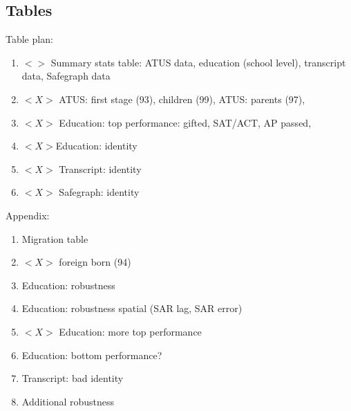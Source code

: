 \documentclass[11pt]{article}
\begin{document}
\clearpage
\subsection{Tables}

Table plan:
\begin{enumerate}
\item $<>$ Summary stats table: ATUS data, education (school level), transcript data, Safegraph data
\item $<X>$ ATUS: first stage (93), children (99), ATUS: parents (97),
\item $<X>$ Education: top performance: gifted, SAT/ACT, AP passed, 
\item $<X> $Education: identity
\item $<X>$ Transcript: identity
\item $<X>$ Safegraph: identity
\end{enumerate}

Appendix:
\begin{enumerate}
\item Migration table
\item $<X>$ foreign born (94)
\item Education: robustness
\item Education: robustness spatial (SAR lag, SAR error)
\item $<X>$ Education: more top performance
\item Education: bottom performance?
\item Transcript: bad identity
\item Additional robustness
\end{enumerate}






\clearpage

\singlespacing

\setcounter{footnote}{0}

\setcounter{section}{0}

\setcounter{page}{1}
\renewcommand\thepage{A.\arabic{page}}
\end{document}

